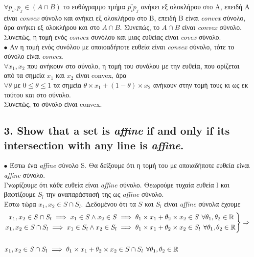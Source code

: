 \documentclass[12pt]{article}
\newcommand{\R}{\mathbb{R}}
\newcommand{\margin}{\hspace{4pt}}
\newenvironment{rcases}
    {\left.\begin{aligned}}
    {\end{aligned}\right\rbrace}
\begin{document}
$\forall p_i, p_j \in (A\cap B)$ το ευθύγραμμο τμήμα $\overleftrightarrow{p_{i}p_{j}}$ ανήκει εξ ολοκλήρου στο Α, 
επειδή Α είναι \textit{convex} σύνολο και ανήκει εξ ολοκλήρου στο Β, 
επειδή Β είναι \textit{convex} σύνολο, 
άρα ανήκει εξ ολοκλήρου και στο $Α \cap Β$. 
Συνεπώς, το $Α \cap Β$ είναι \textit{convex} σύνολο. \\

Συνεπώς, η τομή ενός \textit{convex} συνόλου και μιας ευθείας είναι \textit{covex} σύνολο. \\

$\bullet$ Aν η τομή ενός συνόλου με οποιοαδήποτε ευθεία είναι \textit{convex} σύνολο, 
τότε το σύνολο είναι \textit{convex}. \\

$\forall x_1, x_2$ που ανήκουν στο σύνολο, η τομή του συνόλου με την ευθεία, 
που ορίζεται από τα  σημεία $x_1$ και $x_2$ είναι convex, άρα \\

$\forall \theta$ με $0 \leq \theta \leq 1$ τα σημεία 
$\theta \times x_1 + (1 - \theta) \times x_2$ ανήκουν στην τομή τους 
κι ως εκ τούτου και στο σύνολο. \\

Συνεπώς, το σύνολο είναι convex.

\vspace{2in} %

\pagebreak

\subsection*{3. Show that a set is \textit{affine} if and only if its intersection with any line is \textit{affine}.}

$\bullet$ Έστω ένα \textit{affine} σύνολο S. Θα δείξουμε ότι η τομή του με οποιαδήποτε ευθεία είναι \textit{affine} σύνολο.\\

Γνωρίζουμε ότι κάθε ευθεία είναι \textit{affine} σύνολο.
Θεωρούμε τυχαία ευθεία l και βαφτίζουμε $S_l$ την αναπαράστασή της ως \textit{affine} σύνολο.\\

Έστω τώρα $x_1, x_2 \in S \cap S_l$.
Δεδομένου ότι τα $S$ και $S_l$ είναι \textit{affine} σύνολα έχουμε\\

\begin{align*}
    &\begin{rcases}
        x_1, x_2 \in S \cap S_l \implies x_1 \in S \wedge x_2 \in S & \implies \theta_1 \times x_1 + \theta_2 \times x_2 \in S \margin \forall \theta_1, \theta_2 \in \R\\
        x_1, x_2 \in S \cap S_l \implies x_1 \in S_l \wedge x_2 \in S_l & \implies \theta_1 \times x_1 + \theta_2 \times x_2 \in S_l \margin \forall \theta_1, \theta_2 \in \R
    \end{rcases}
    \Rightarrow \\ \\
    &x_1, x_2 \in S \cap S_l \implies \theta_1 \times x_1 + \theta_2 \times x_2 \in S \cap S_l \margin \forall \theta_1, \theta_2 \in \R
\end{align*}
\end{document}
